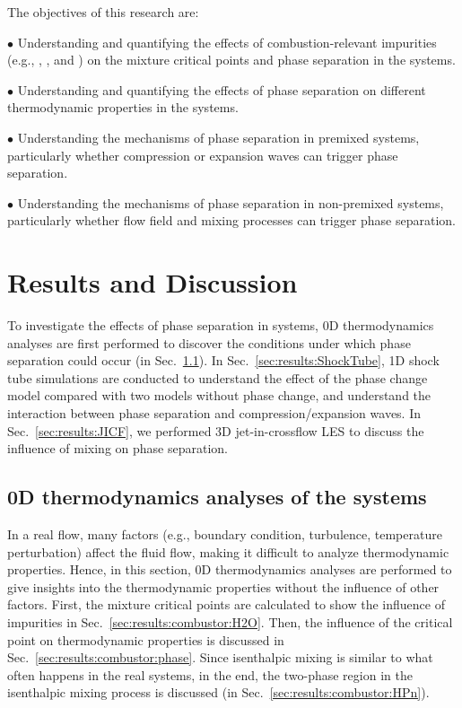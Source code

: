 The objectives of this research are:

\noindent$\bullet$ Understanding and quantifying the effects of combustion-relevant impurities (e.g., , , and ) on the mixture critical points and phase separation in the  systems.

\noindent$\bullet$ Understanding and quantifying the effects of phase separation on different thermodynamic properties in the  systems.

\noindent$\bullet$ Understanding the mechanisms of phase separation in premixed  systems, particularly whether compression or expansion waves can trigger phase separation.

\noindent$\bullet$ Understanding the mechanisms of phase separation in non-premixed  systems, particularly whether flow field and mixing processes can trigger phase separation.








\section{Results and Discussion}

To investigate the effects of phase separation in  systems, 0D thermodynamics analyses are first performed to discover the conditions under which phase separation could occur (in Sec.~\ref{sec:results:ThermAnalysis}). In Sec.~\ref{sec:results:ShockTube}, 1D shock tube simulations are conducted to understand the effect of the phase change model compared with two models without phase change, and understand the interaction between phase separation and compression/expansion waves. In Sec.~\ref{sec:results:JICF}, we performed 3D jet-in-crossflow LES to discuss the influence of mixing on phase separation. 

\subsection{0D thermodynamics analyses of the  systems}
\label{sec:results:ThermAnalysis}

In a real flow, many factors (e.g., boundary condition, turbulence, temperature perturbation) affect the fluid flow, making it difficult to analyze thermodynamic properties. Hence, in this section, 0D thermodynamics analyses are performed to give insights into the thermodynamic properties without the influence of other factors. First, the mixture critical points are calculated to show the influence of impurities in Sec.~\ref{sec:results:combustor:H2O}. Then, the influence of the critical point on thermodynamic properties is discussed in Sec.~\ref{sec:results:combustor:phase}. Since isenthalpic mixing is similar to what often happens in the real  systems, in the end, the two-phase region in the isenthalpic mixing process is discussed (in Sec.~\ref{sec:results:combustor:HPn}). 

